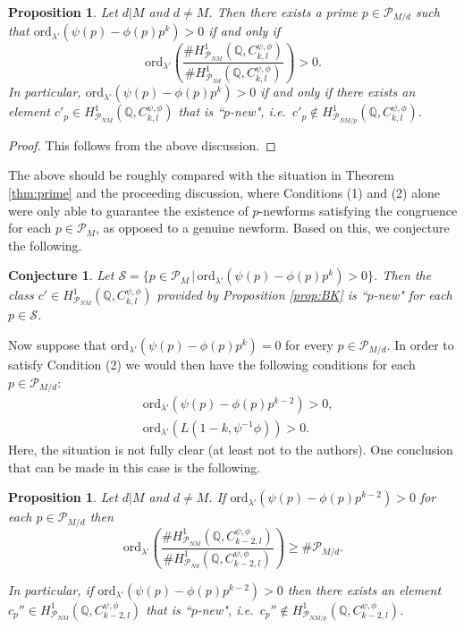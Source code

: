 \documentclass{amsart}
\theoremstyle{plain}
\newtheorem{propn}[theorem]{Proposition}
\newtheorem{conj}[theorem]{Conjecture}
\theoremstyle{definition}
\begin{document}
\begin{propn}\label{prop:BK1}
    Let $d|M$ and $d\neq M$. Then there exists a prime $p\in \mathcal{P}_{M/d}$ such that $\text{ord}_{\lambda'}(\psi(p)-\phi(p)p^k)>0$ if and only if \[\text{ord}_{\lambda'}\left(\frac{\#H^1_{\mathcal{P}_{NM}}(\mathbb{Q},C_{k,l}^{\psi,\phi})}{\#H^1_{\mathcal{P}_{Nd}}(\mathbb{Q},C_{k,l}^{\psi,\phi})}\right) > 0.\] In particular, $\text{ord}_{\lambda'}(\psi(p)-\phi(p)p^k)>0$ if and only if there exists an element $c'_p\in H^1_{\mathcal{P}_{NM}}(\mathbb{Q},C_{k,l}^{\psi,\phi})$ that is ``$p$-new", i.e.\ $c'_p\notin H^1_{\mathcal{P}_{NM/p}}(\mathbb{Q},C_{k,l}^{\psi,\phi})$.
    \end{propn}

    \begin{proof}
    This follows from the above discussion.
    \end{proof}

    \noindent The above should be roughly compared with the situation in Theorem \ref{thm:prime} and the proceeding discussion, where Conditions (1) and (2) alone were only able to guarantee the existence of $p$-newforms satisfying the congruence for each $p\in\mathcal{P}_M$, as opposed to a genuine newform. Based on this, we conjecture the following.

    \begin{conj}\label{conj:pnew}
    Let $\mathcal{S} = \{p\in \mathcal{P}_M\,|\,\text{ord}_{\lambda'}(\psi(p)-\phi(p)p^k)>0\}$. Then the class $c'\in H^1_{\mathcal{P}_{NM}}(\mathbb{Q},C_{k,l}^{\psi,\phi})$ provided by Proposition \ref{prop:BK} is ``$p$-new" for each $p\in \mathcal{S}$.
    \end{conj}

   Now suppose that $\text{ord}_{\lambda'}(\psi(p)-\phi(p)p^k) = 0$ for every $p\in\mathcal{P}_{M/d}$. In order to satisfy Condition (2) we would then have the following conditions for each $p\in\mathcal{P}_{M/d}$: \begin{align*}&\text{ord}_{\lambda'}(\psi(p)-\phi(p)p^{k-2})>0,\\  &\text{ord}_{\lambda'}(L(1-k,\psi^{-1}\phi))>0.\end{align*} Here, the situation is not fully clear (at least not to the authors). One conclusion that can be made in this case is the following.

    \begin{propn}\label{prop:BK2}
    Let $d|M$ and $d\neq M$. If $\text{ord}_{\lambda'}(\psi(p)-\phi(p)p^{k-2})>0$ for each $p\in\mathcal{P}_{M/d}$ then \[\text{ord}_{\lambda'}\left(\frac{\#H^1_{\mathcal{P}_{NM}}(\mathbb{Q},C_{k-2,l}^{\psi,\phi})}{\#H^1_{\mathcal{P}_{Nd}}(\mathbb{Q},C_{k-2,l}^{\psi,\phi})}\right) \geq \#\mathcal{P}_{M/d}.\]
    
    In particular, if $\text{ord}_{\lambda'}(\psi(p)-\phi(p)p^{k-2})>0$ then there exists an element $c_p{''}\in H^1_{\mathcal{P}_{NM}}(\mathbb{Q},C_{k-2,l}^{\psi,\phi})$ that is ``$p$-new", i.e.\ $c_p{''}\notin H^1_{\mathcal{P}_{NM/p}}(\mathbb{Q},C_{k-2,l}^{\psi,\phi})$.
    \end{propn}
\end{document}
